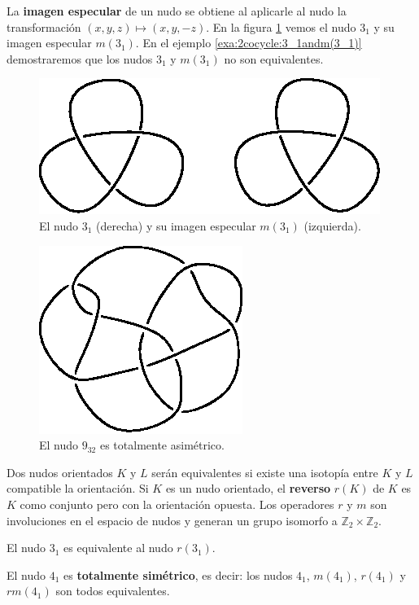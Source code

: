 \documentclass[graybox]{svmult}
\newcommand{\Z}{\mathbb{Z}}
\begin{document}
La \textbf{imagen especular} de un nudo se obtiene al aplicarle al nudo la
transformación $(x,y,z)\mapsto(x,y,-z)$.  En la figura
\ref{fig:trefoil_and_mirror} vemos el nudo $3_1$ y su imagen especular
$m(3_1)$. En el ejemplo \ref{exa:2cocycle:3_1andm(3_1)} demostraremos que los nudos
$3_1$ y $m(3_1)$ no son equivalentes. 
\begin{figure}[ht]
	\centering
		\includegraphics[scale=0.7]{images/trefoil_and_mirror}
		\caption{El nudo $3_1$ (derecha) y su imagen especular $m(3_1)$
		(izquierda).}
		\label{fig:trefoil_and_mirror}
\end{figure}
\begin{figure}[ht]
		\centering
		\includegraphics[scale=0.7]{images/9_32}
		\caption{El nudo $9_{32}$ es totalmente asimétrico.}
		\label{fig:9_32}
\end{figure}

Dos nudos orientados $K$ y $L$ serán equivalentes si existe una isotopía
entre $K$ y $L$ compatible la orientación.  Si $K$ es un nudo orientado, el
\textbf{reverso} $r(K)$ de $K$ es $K$ como conjunto pero con la orientación
opuesta. Los operadores $r$ y $m$ son involuciones en el espacio de nudos y
generan un grupo isomorfo a $\Z_2\times\Z_2$.

\begin{example}
	El nudo $3_1$ es equivalente al nudo $r(3_1)$. 
\end{example}

\begin{example}
	El nudo $4_1$ es
	\textbf{totalmente simétrico}, es decir: los nudos $4_1$, $m(4_1)$,
	$r(4_1)$ y $rm(4_1)$ son todos equivalentes.  
\end{example}
\end{document}

